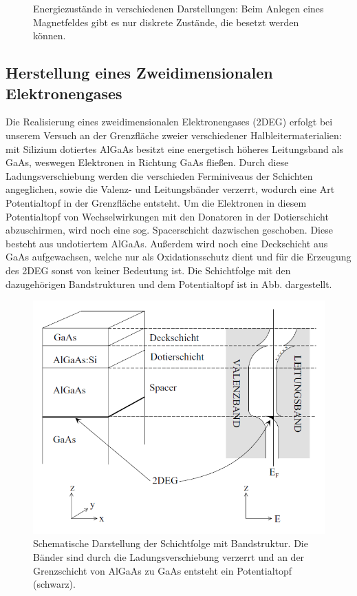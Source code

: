 \begin{figure}
    \centering
    
    \caption{Energiezustände in verschiedenen Darstellungen: Beim Anlegen eines
             Magnetfeldes gibt es nur diskrete Zustände, die besetzt werden können.}
    \label{fig:landau}
\end{figure}

    \subsection{Herstellung eines Zweidimensionalen Elektronengases}
    Die Realisierung eines zweidimensionalen Elektronengases (2DEG) erfolgt bei
    unserem Versuch an der Grenzfläche zweier verschiedener Halbleitermaterialien:
    mit Silizium dotiertes AlGaAs besitzt eine energetisch höheres Leitungsband
    als GaAs, weswegen Elektronen in Richtung GaAs fließen. Durch diese
    Ladungsverschiebung werden die verschieden Ferminiveaus der Schichten
    angeglichen, sowie die Valenz- und Leitungsbänder verzerrt, wodurch eine Art
    Potentialtopf in der Grenzfläche entsteht. Um die Elektronen in diesem
    Potentialtopf von Wechselwirkungen mit den Donatoren in der Dotierschicht
    abzuschirmen, wird noch eine sog. Spacerschicht dazwischen geschoben.
    Diese besteht aus undotiertem AlGaAs. Außerdem wird noch eine Deckschicht
    aus GaAs aufgewachsen, welche nur als Oxidationsschutz dient und für die
    Erzeugung des 2DEG sonst von keiner Bedeutung ist. Die Schichtfolge mit den
    dazugehörigen Bandstrukturen und dem Potentialtopf ist in Abb. dargestellt.

\begin{figure}[H]
	\centering
	\includegraphics[width=0.75\linewidth]{Abb/Schichtfolge.PNG}
	\caption{Schematische Darstellung der Schichtfolge mit Bandstruktur. Die Bänder sind durch die Ladungsverschiebung verzerrt und an der Grenzschicht von AlGaAs zu GaAs entsteht ein Potentialtopf (schwarz).}
\end{figure}

